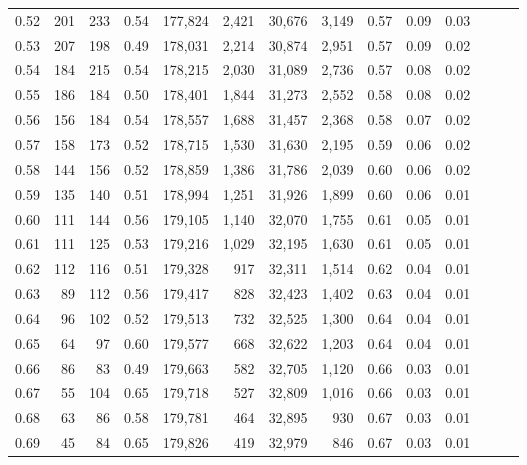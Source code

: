\begin{tabular}{rrrrrrrrrrrrrr}
0.52 &     201 &    233 &  0.54 &  177,824 &    2,421 &  30,676 &   3,149 &  0.57 &  0.09 &      0.03 \\
0.53 &     207 &    198 &  0.49 &  178,031 &    2,214 &  30,874 &   2,951 &  0.57 &  0.09 &      0.02 \\
0.54 &     184 &    215 &  0.54 &  178,215 &    2,030 &  31,089 &   2,736 &  0.57 &  0.08 &      0.02 \\
0.55 &     186 &    184 &  0.50 &  178,401 &    1,844 &  31,273 &   2,552 &  0.58 &  0.08 &      0.02 \\
0.56 &     156 &    184 &  0.54 &  178,557 &    1,688 &  31,457 &   2,368 &  0.58 &  0.07 &      0.02 \\
0.57 &     158 &    173 &  0.52 &  178,715 &    1,530 &  31,630 &   2,195 &  0.59 &  0.06 &      0.02 \\
0.58 &     144 &    156 &  0.52 &  178,859 &    1,386 &  31,786 &   2,039 &  0.60 &  0.06 &      0.02 \\
0.59 &     135 &    140 &  0.51 &  178,994 &    1,251 &  31,926 &   1,899 &  0.60 &  0.06 &      0.01 \\
0.60 &     111 &    144 &  0.56 &  179,105 &    1,140 &  32,070 &   1,755 &  0.61 &  0.05 &      0.01 \\
0.61 &     111 &    125 &  0.53 &  179,216 &    1,029 &  32,195 &   1,630 &  0.61 &  0.05 &      0.01 \\
0.62 &     112 &    116 &  0.51 &  179,328 &      917 &  32,311 &   1,514 &  0.62 &  0.04 &      0.01 \\
0.63 &      89 &    112 &  0.56 &  179,417 &      828 &  32,423 &   1,402 &  0.63 &  0.04 &      0.01 \\
0.64 &      96 &    102 &  0.52 &  179,513 &      732 &  32,525 &   1,300 &  0.64 &  0.04 &      0.01 \\
0.65 &      64 &     97 &  0.60 &  179,577 &      668 &  32,622 &   1,203 &  0.64 &  0.04 &      0.01 \\
0.66 &      86 &     83 &  0.49 &  179,663 &      582 &  32,705 &   1,120 &  0.66 &  0.03 &      0.01 \\
0.67 &      55 &    104 &  0.65 &  179,718 &      527 &  32,809 &   1,016 &  0.66 &  0.03 &      0.01 \\
0.68 &      63 &     86 &  0.58 &  179,781 &      464 &  32,895 &     930 &  0.67 &  0.03 &      0.01 \\
0.69 &      45 &     84 &  0.65 &  179,826 &      419 &  32,979 &     846 &  0.67 &  0.03 &      0.01 \\

\end{tabular}
